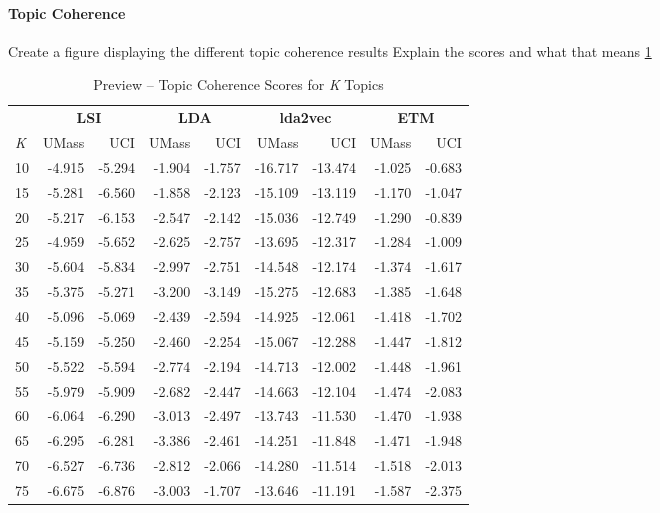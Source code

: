 \documentclass[letterpaper,12pt]{article}
\begin{document}
\paragraph{Topic Coherence}
Create a figure displaying the different topic coherence results
Explain the scores and what that means
\ref{tab:preview_tc}
\begin{table}
	\caption{\label{tab:preview_tc} Preview -- Topic Coherence Scores for \emph{K} Topics}
	\begin{center}
		\begin{tabular}{| l |rr|rr|rr|rr|}
			\hline
			{} & \multicolumn{2}{c|}{\textbf{LSI}} & \multicolumn{2}{c|}{\textbf{LDA}} & \multicolumn{2}{c|}{\textbf{lda2vec}} & \multicolumn{2}{c|}{\textbf{ETM}} \\
			\emph{K} &  UMass &    UCI &  UMass &    UCI &   UMass &     UCI &  UMass &    UCI \\
			\hline
			10  & -4.915 & -5.294 & -1.904 & -1.757 & -16.717 & -13.474 & -1.025 & -0.683 \\
			15  & -5.281 & -6.560 & -1.858 & -2.123 & -15.109 & -13.119 & -1.170 & -1.047 \\
			20  & -5.217 & -6.153 & -2.547 & -2.142 & -15.036 & -12.749 & -1.290 & -0.839 \\
			25  & -4.959 & -5.652 & -2.625 & -2.757 & -13.695 & -12.317 & -1.284 & -1.009 \\
			30  & -5.604 & -5.834 & -2.997 & -2.751 & -14.548 & -12.174 & -1.374 & -1.617 \\
			35  & -5.375 & -5.271 & -3.200 & -3.149 & -15.275 & -12.683 & -1.385 & -1.648 \\
			40  & -5.096 & -5.069 & -2.439 & -2.594 & -14.925 & -12.061 & -1.418 & -1.702 \\
			45  & -5.159 & -5.250 & -2.460 & -2.254 & -15.067 & -12.288 & -1.447 & -1.812 \\
			50  & -5.522 & -5.594 & -2.774 & -2.194 & -14.713 & -12.002 & -1.448 & -1.961 \\
			55  & -5.979 & -5.909 & -2.682 & -2.447 & -14.663 & -12.104 & -1.474 & -2.083 \\
			60  & -6.064 & -6.290 & -3.013 & -2.497 & -13.743 & -11.530 & -1.470 & -1.938 \\
			65  & -6.295 & -6.281 & -3.386 & -2.461 & -14.251 & -11.848 & -1.471 & -1.948 \\
			70  & -6.527 & -6.736 & -2.812 & -2.066 & -14.280 & -11.514 & -1.518 & -2.013 \\
			75  & -6.675 & -6.876 & -3.003 & -1.707 & -13.646 & -11.191 & -1.587 & -2.375 \\

\end{tabular}
\end{center}
\end{table}
\end{document}
